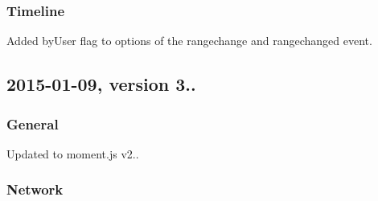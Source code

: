 \subsubsection*{Timeline}


\begin{DoxyItemize}
\item Added by\+User flag to options of the rangechange and rangechanged event.
\end{DoxyItemize}

\subsection*{2015-\/01-\/09, version 3..}

\subsubsection*{General}


\begin{DoxyItemize}
\item Updated to moment.\+js v2..
\end{DoxyItemize}

\subsubsection*{Network}


